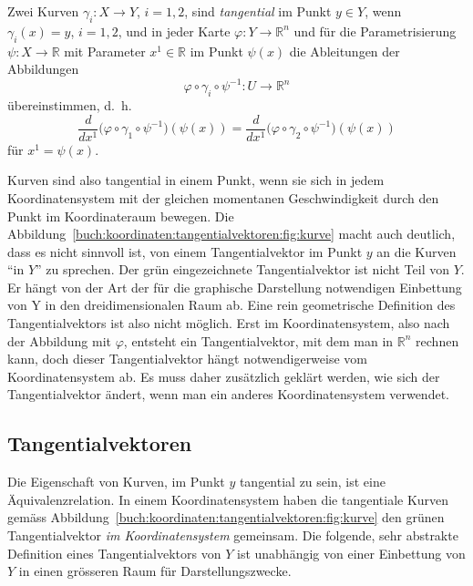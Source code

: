 %

\begin{definition}
Zwei Kurven $\gamma_i\colon X\to Y$, $i=1,2$, sind
{\em tangential} im Punkt $y\in Y$, wenn
$\gamma_i(x) = y$, $i=1,2$, und
in jeder Karte
$\varphi\colon Y\to\mathbb{R}^n$ und für die Parametrisierung
$\psi\colon X\to \mathbb{R}$ mit Parameter $x^1\in\mathbb{R}$ 
im Punkt $\psi(x)$ die Ableitungen der Abbildungen
\[
\varphi
\circ
\gamma_i
\circ
\psi^{-1}
\colon
U\to\mathbb{R}^n
\]
übereinstimmen, d.~h.
\begin{equation}
\frac{d}{dx^1}
\bigl(\varphi\circ\gamma_1\circ\psi^{-1}\bigr)(\psi(x))
=
\frac{d}{dx^1}
\bigl(\varphi\circ\gamma_2\circ\psi^{-1}\bigr)(\psi(x))
\label{buch:koordinaten:tangentialvektoren:eqn:tangential}
\end{equation}
für $x^1=\psi(x)$.
\end{definition}

Kurven sind also tangential in einem Punkt, wenn sie sich in jedem
Koordinatensystem mit der gleichen momentanen Geschwindigkeit
durch den Punkt im Koordinateraum bewegen.
Die Abbildung~\ref{buch:koordinaten:tangentialvektoren:fig:kurve}
macht auch deutlich, dass es nicht sinnvoll ist, von einem
Tangentialvektor im Punkt $y$ an die Kurven ``in $Y$'' zu sprechen.
Der grün eingezeichnete Tangentialvektor ist nicht Teil von $Y$.
Er hängt von der Art der für die graphische Darstellung notwendigen
Einbettung von Y in den dreidimensionalen Raum ab.
Eine rein geometrische Definition des Tangentialvektors ist also
nicht möglich.
Erst im Koordinatensystem, also nach der Abbildung mit $\varphi$,
entsteht ein Tangentialvektor, mit dem man in $\mathbb{R}^n$
rechnen kann, doch dieser Tangentialvektor hängt notwendigerweise
vom Koordinatensystem ab.
Es muss daher zusätzlich geklärt werden, wie sich der Tangentialvektor
ändert, wenn man ein anderes Koordinatensystem verwendet.

%
%
\subsection{Tangentialvektoren}
Die Eigenschaft von Kurven, im Punkt $y$ tangential zu sein, ist
eine Äquivalenzrelation.
In einem Koordinatensystem haben die tangentiale Kurven gemäss
Abbildung~\ref{buch:koordinaten:tangentialvektoren:fig:kurve}
den grünen Tangentialvektor {\em im Koordinatensystem} gemeinsam.
Die folgende, sehr abstrakte Definition eines Tangentialvektors
von $Y$ ist unabhängig von einer Einbettung von $Y$ in einen
grösseren Raum für Darstellungszwecke.

